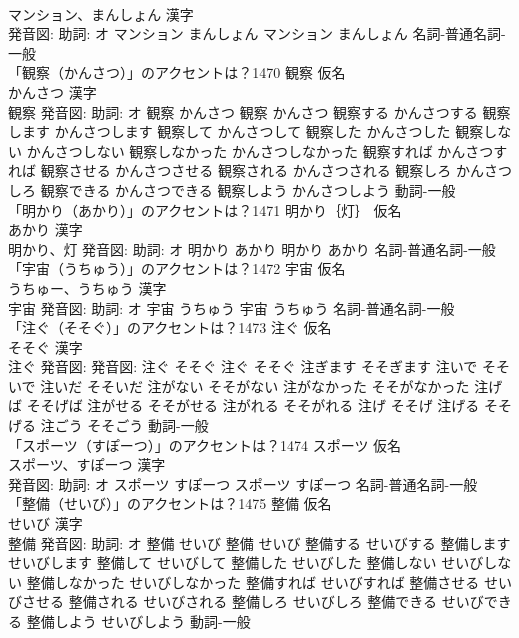 \documentclass[8pt]{extreport}
\begin{document}
\begin{CJK}{UTF8}{min}
\\	マンション、まんしょん 漢字　
\\	発音図: 助詞: オ	マンション まんしょん		マンション まんしょん				名詞-普通名詞-一般 
\\	「観察（かんさつ）」のアクセントは？1470	観察 仮名　
\\	かんさつ 漢字　
\\	観察 発音図: 助詞: オ	観察 かんさつ		観察 かんさつ 観察する かんさつする 観察します かんさつします 観察して かんさつして 観察した かんさつした 観察しない かんさつしない 観察しなかった かんさつしなかった 観察すれば かんさつすれば 観察させる かんさつさせる 観察される かんさつされる 観察しろ かんさつしろ 観察できる かんさつできる 観察しよう かんさつしよう				動詞-一般 
\\	「明かり（あかり）」のアクセントは？1471	明かり｛灯｝ 仮名　
\\	あかり 漢字　
\\	明かり、灯 発音図: 助詞: オ	明かり あかり		明かり あかり				名詞-普通名詞-一般 
\\	「宇宙（うちゅう）」のアクセントは？1472	宇宙 仮名　
\\	うちゅー、うちゅう 漢字　
\\	宇宙 発音図: 助詞: オ	宇宙 うちゅう		宇宙 うちゅう				名詞-普通名詞-一般 
\\	「注ぐ（そそぐ）」のアクセントは？1473	注ぐ 仮名　
\\	そそぐ 漢字　
\\	注ぐ 発音図: 発音図:	注ぐ そそぐ		注ぐ そそぐ 注ぎます そそぎます 注いで そそいで 注いだ そそいだ 注がない そそがない 注がなかった そそがなかった 注げば そそげば 注がせる そそがせる 注がれる そそがれる 注げ そそげ 注げる そそげる 注ごう そそごう				動詞-一般 
\\	「スポーツ（すぽーつ）」のアクセントは？1474	スポーツ 仮名　
\\	スポーツ、すぽーつ 漢字　
\\	発音図: 助詞: オ	スポーツ すぽーつ		スポーツ すぽーつ				名詞-普通名詞-一般 
\\	「整備（せいび）」のアクセントは？1475	整備 仮名　
\\	せいび 漢字　
\\	整備 発音図: 助詞: オ	整備 せいび		整備 せいび 整備する せいびする 整備します せいびします 整備して せいびして 整備した せいびした 整備しない せいびしない 整備しなかった せいびしなかった 整備すれば せいびすれば 整備させる せいびさせる 整備される せいびされる 整備しろ せいびしろ 整備できる せいびできる 整備しよう せいびしよう				動詞-一般 

\end{CJK}
\end{document}
